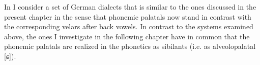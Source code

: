 In  I consider a set of German dialects that is similar to the ones discussed in the present chapter in the sense that phonemic palatals now stand in contrast with the corresponding velars after back vowels. In contrast to the systems examined above, the ones I investigate in the following chapter have in common that the phonemic palatals are realized in the phonetics as sibilants (i.e. as alveolopalatal [ɕ]).
